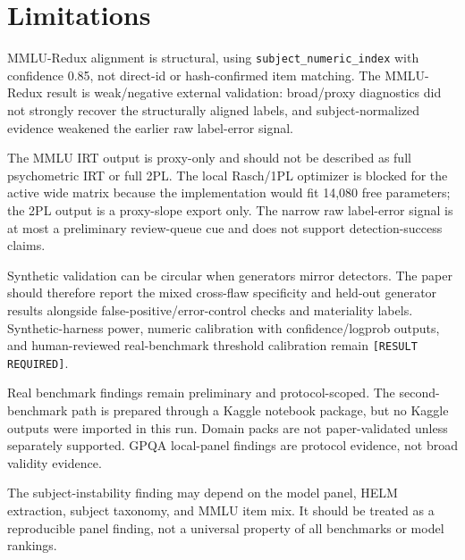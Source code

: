 \section{Limitations}

MMLU-Redux alignment is structural, using \texttt{subject\_numeric\_index} with confidence 0.85,
not direct-id or hash-confirmed item matching. The MMLU-Redux result is weak/negative external
validation: broad/proxy diagnostics did not strongly recover the structurally aligned labels, and
subject-normalized evidence weakened the earlier raw label-error signal.

The MMLU IRT output is proxy-only and should not be described as full psychometric IRT or full 2PL.
The local Rasch/1PL optimizer is blocked for the active wide matrix because the implementation would
fit 14,080 free parameters; the 2PL output is a proxy-slope export only.
The narrow raw label-error signal is at most a preliminary review-queue cue and does not support
detection-success claims.

Synthetic validation can be circular when generators mirror detectors. The paper should therefore
report the mixed cross-flaw specificity and held-out generator results alongside
false-positive/error-control checks and materiality labels. Synthetic-harness power, numeric
calibration with confidence/logprob outputs, and human-reviewed real-benchmark threshold calibration
remain \texttt{[RESULT REQUIRED]}.

Real benchmark findings remain preliminary and protocol-scoped. The second-benchmark path is
prepared through a Kaggle notebook package, but no Kaggle outputs were imported in this run. Domain
packs are not paper-validated unless separately supported. GPQA local-panel findings are protocol
evidence, not broad validity evidence.

The subject-instability finding may depend on the model panel, HELM extraction, subject taxonomy,
and MMLU item mix. It should be treated as a reproducible panel finding, not a universal property of
all benchmarks or model rankings.
